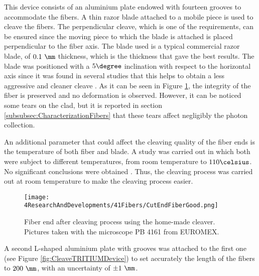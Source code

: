 This device consists of an aluminium plate endowed with fourteen grooves to accommodate the fibers. A thin razor blade attached to a mobile piece is used to cleave the fibers. The perpendicular cleave, which is one of the requirements, can be ensured since the moving piece to which the blade is attached is placed perpendicular to the fiber axis. The blade used is a typical commercial razor blade, of $0.1~\mm$ thickness, which is the thickness that gave the best results. The blade was positioned with a $5\degree$ inclination with respect to the horizontal axis since it was found in several studies that this helps to obtain a less aggressive and cleaner cleave \cite{AngleBlade, TemperatureBlade}. As it can be seen in Figure \ref{fig:CleavingFiberEnd}, the integrity of the fiber is preserved and no deformation is observed. However, it can be noticed some tears on the clad, but it is reported in section \ref{subsubsec:CharacterizationFibers} that these tears affect negligibly the photon collection. 

An additional parameter that could affect the cleaving quality of the fiber ends is the temperature of both fiber and blade. A study was carried out in which both were subject to different temperatures, from room temperature to $110\celsius$. No significant conclusions were obtained \cite{TFGAlberto}. Thus, the cleaving process was carried out at room temperature to make the cleaving process easier.

\begin{figure}[h]
\centering
\texttt{[image: 4ResearchAndDevelopments/41Fibers/CutEndFiberGood.png]}
\caption{Fiber end after cleaving process using the home-made cleaver. Pictures taken with the microscope PB 4161 from EUROMEX.\label{fig:CleavingFiberEnd}}
\end{figure}

A second L-shaped aluminium plate with grooves was attached to the first one (see Figure \ref{fig:CleaveTRITIUMDevice}) to set accurately the length of the fibers to $200~\mm$, with an uncertainty of $\pm 1~\mm$.